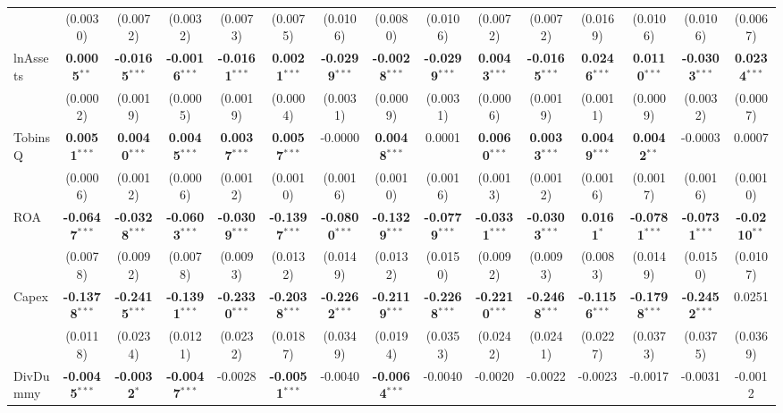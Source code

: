 \documentclass[11pt,a4paper]{article}
\begin{document}
\begin{table}[htbp]
\begin{tabular}{lcccccccccccccc}
 & (0.0030) & (0.0072) & (0.0032) & (0.0073) & (0.0075) & (0.0106) & (0.0080) & (0.0106) & (0.0072) & (0.0072) & (0.0169) & (0.0106) & (0.0106) & (0.0067) \\
lnAssets & \textbf{0.0005}$^{**}$ & \textbf{-0.0165}$^{***}$ & \textbf{-0.0016}$^{***}$ & \textbf{-0.0161}$^{***}$ & \textbf{0.0021}$^{***}$ & \textbf{-0.0299}$^{***}$ & \textbf{-0.0028}$^{***}$ & \textbf{-0.0299}$^{***}$ & \textbf{0.0043}$^{***}$ & \textbf{-0.0165}$^{***}$ & \textbf{0.0246}$^{***}$ & \textbf{0.0110}$^{***}$ & \textbf{-0.0303}$^{***}$ & \textbf{0.0234}$^{***}$ \\
 & (0.0002) & (0.0019) & (0.0005) & (0.0019) & (0.0004) & (0.0031) & (0.0009) & (0.0031) & (0.0006) & (0.0019) & (0.0011) & (0.0009) & (0.0032) & (0.0007) \\
TobinsQ & \textbf{0.0051}$^{***}$ & \textbf{0.0040}$^{***}$ & \textbf{0.0045}$^{***}$ & \textbf{0.0037}$^{***}$ & \textbf{0.0057}$^{***}$ & -0.0000 & \textbf{0.0048}$^{***}$ & 0.0001 & \textbf{0.0060}$^{***}$ & \textbf{0.0033}$^{***}$ & \textbf{0.0049}$^{***}$ & \textbf{0.0042}$^{**}$ & -0.0003 & 0.0007 \\
 & (0.0006) & (0.0012) & (0.0006) & (0.0012) & (0.0010) & (0.0016) & (0.0010) & (0.0016) & (0.0013) & (0.0012) & (0.0016) & (0.0017) & (0.0016) & (0.0010) \\
ROA & \textbf{-0.0647}$^{***}$ & \textbf{-0.0328}$^{***}$ & \textbf{-0.0603}$^{***}$ & \textbf{-0.0309}$^{***}$ & \textbf{-0.1397}$^{***}$ & \textbf{-0.0800}$^{***}$ & \textbf{-0.1329}$^{***}$ & \textbf{-0.0779}$^{***}$ & \textbf{-0.0331}$^{***}$ & \textbf{-0.0303}$^{***}$ & \textbf{0.0161}$^{*}$ & \textbf{-0.0781}$^{***}$ & \textbf{-0.0731}$^{***}$ & \textbf{-0.0210}$^{**}$ \\
 & (0.0078) & (0.0092) & (0.0078) & (0.0093) & (0.0132) & (0.0149) & (0.0132) & (0.0150) & (0.0092) & (0.0093) & (0.0083) & (0.0149) & (0.0150) & (0.0107) \\
Capex & \textbf{-0.1378}$^{***}$ & \textbf{-0.2415}$^{***}$ & \textbf{-0.1391}$^{***}$ & \textbf{-0.2330}$^{***}$ & \textbf{-0.2038}$^{***}$ & \textbf{-0.2262}$^{***}$ & \textbf{-0.2119}$^{***}$ & \textbf{-0.2268}$^{***}$ & \textbf{-0.2210}$^{***}$ & \textbf{-0.2468}$^{***}$ & \textbf{-0.1156}$^{***}$ & \textbf{-0.1798}$^{***}$ & \textbf{-0.2452}$^{***}$ & 0.0251 \\
 & (0.0118) & (0.0234) & (0.0121) & (0.0232) & (0.0187) & (0.0349) & (0.0194) & (0.0353) & (0.0242) & (0.0241) & (0.0227) & (0.0373) & (0.0375) & (0.0369) \\
DivDummy & \textbf{-0.0045}$^{***}$ & \textbf{-0.0032}$^{*}$ & \textbf{-0.0047}$^{***}$ & -0.0028 & \textbf{-0.0051}$^{***}$ & -0.0040 & \textbf{-0.0064}$^{***}$ & -0.0040 & -0.0020 & -0.0022 & -0.0023 & -0.0017 & -0.0031 & -0.0012 \\

\end{tabular}
\end{table}
\end{document}
